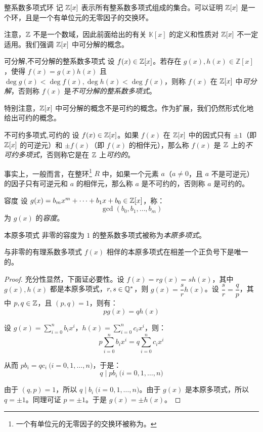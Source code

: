 \begin{definition}{整系数多项式环}
	记 $\mathbb Z[x]$ 表示所有整系数多项式组成的集合。可以证明 $\mathbb Z[x]$ 是一个环，且是一个有单位元的无零因子的交换环。
\end{definition}

注意，$\mathbb Z$ 不是一个数域，因此前面给出的有关 $\mathbb K[x]$ 的定义和性质对 $\mathbb Z[x]$ 不一定适用。我们强调 $\mathbb Z[x]$ 中可分解的概念。

\begin{definition}{可分解,不可分解的整系数多项式}
	设 $f(x) \in \mathbb Z[x]$。若存在 $g(x), h(x) \in \mathbb Z[x]$，使得 $f(x) = g(x) h(x)$ 且 $\deg g(x) < \deg f(x), \deg h(x) < \deg f(x)$，则称 $f(x)$ 在 $\mathbb Z[x]$ 中\emph{可分解}，否则称 $f(x)$ 是\emph{不可分解的整系数多项式}。
\end{definition}

特别注意，$\mathbb Z[x]$ 中可分解的概念不是可约的概念。作为扩展，我们仍然形式化地给出可约的概念。

\begin{definition}{不可约多项式,可约的}
	设 $f(x) \in \mathbb Z[x]$。如果 $f(x)$ 在 $\mathbb Z[x]$ 中的因式只有 $\pm 1$（即 $\mathbb Z[x]$ 的可逆元）和 $\pm f(x)$（即 $f(x)$ 的相伴元），那么称 $f(x)$ 是 $\mathbb Z$ 上的\emph{不可约多项式}，否则称它是在 $\mathbb Z$ 上\emph{可约的}。
\end{definition}

事实上，一般而言，在整环\footnote{一个有单位元的无零因子的交换环被称为\emph{}。} $R$ 中，如果一个元素 $a$（$a \ne 0$，且 $a$ 不是可逆元）的因子只有可逆元和 $a$ 的相伴元，那么称 $a$ 是不可约的，否则称 $a$ 是可约的。

\bigskip

\begin{definition}{容度}
	设 $g(x) = b_m x^m + \cdots + b_1 x + b_0 \in \mathbb Z[x]$，称：
	$$
	\gcd(b_0, b_1, \ldots, b_m)
	$$
	为 $g(x)$ 的\emph{容度}。
\end{definition}

\begin{definition}{本原多项式}
	非零的容度为 $1$ 的整系数多项式被称为\emph{本原多项式}。
\end{definition}

\begin{proposition}
	与非零的有理系数多项式 $f(x)$ 相伴的本原多项式在相差一个正负号下是唯一的。
\end{proposition}

\begin{proof}
	充分性显然，下面证必要性。设 $f(x) = r g(x) = s h(x)$，其中 $g(x), h(x)$ 都是本原多项式，$r, s \in \mathbb Q^*$，则 $g(x) = \dfrac{s}{r} h(x)$。设 $\dfrac{s}{r} = \dfrac{q}{p}$，其中 $p, q \in \mathbb Z$，且 $(p, q) = 1$，则有：
	$$
	p g(x) = q h(x)
	$$

	设 $g(x) = \sum\limits_{i = 0}^ n b_i x^i$，$h(x) = \sum\limits_{i = 0}^n c_i x^i$，则：
	$$
	p \sum\limits_{i = 0}^n b_i x^i = q \sum\limits_{i = 0}^n c_i x^i
	$$

	从而 $p b_i = q c_i \pod{i = 0, 1, \ldots, n}$，于是：
	$$
	q \mid p b_i \pod{i = 0, 1, \ldots, n}
	$$

	由于 $(q, p) = 1$，所以 $q \mid b_i \pod{i = 0, 1, \ldots, n}$。由于 $g(x)$ 是本原多项式，所以 $q	 = \pm 1$。同理可证 $p = \pm 1$。于是 $g(x) = \pm h(x)$。
\end{proof}

